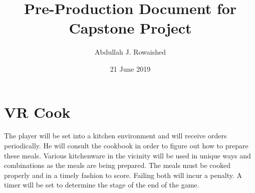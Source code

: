 \documentclass{report}
\title{Pre-Production Document for Capstone Project}
\author{Abdullah J. Rowaished}
\date{21 June 2019}
\begin{document}
\maketitle
\section{VR Cook}
The player will be set into a kitchen environment and will receive orders periodically. He will consult the cookbook in order to figure out how to prepare these meals. Various kitchenware in the vicinity will be used in unique ways and combinations as the meals are being prepared. The meals must be cooked properly and in a timely fashion to score. Failing both will incur a penalty. A timer will be set to determine the stage of the end of the game.
\end{document}
